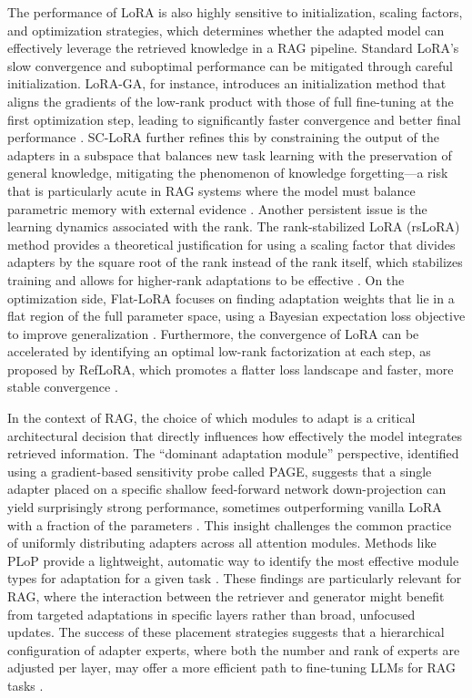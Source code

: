 \documentclass[11pt]{article}
\begin{document}
The performance of LoRA is also highly sensitive to initialization, scaling factors, and optimization strategies, which determines whether the adapted model can effectively leverage the retrieved knowledge in a RAG pipeline. Standard LoRA's slow convergence and suboptimal performance can be mitigated through careful initialization. LoRA-GA, for instance, introduces an initialization method that aligns the gradients of the low-rank product with those of full fine-tuning at the first optimization step, leading to significantly faster convergence and better final performance \cite{ref243}. SC-LoRA further refines this by constraining the output of the adapters in a subspace that balances new task learning with the preservation of general knowledge, mitigating the phenomenon of knowledge forgetting---a risk that is particularly acute in RAG systems where the model must balance parametric memory with external evidence \cite{ref244}. Another persistent issue is the learning dynamics associated with the rank. The rank-stabilized LoRA (rsLoRA) method provides a theoretical justification for using a scaling factor that divides adapters by the square root of the rank instead of the rank itself, which stabilizes training and allows for higher-rank adaptations to be effective \cite{ref245}. On the optimization side, Flat-LoRA focuses on finding adaptation weights that lie in a flat region of the full parameter space, using a Bayesian expectation loss objective to improve generalization \cite{ref246}. Furthermore, the convergence of LoRA can be accelerated by identifying an optimal low-rank factorization at each step, as proposed by RefLoRA, which promotes a flatter loss landscape and faster, more stable convergence \cite{ref247}.

In the context of RAG, the choice of which modules to adapt is a critical architectural decision that directly influences how effectively the model integrates retrieved information. The ``dominant adaptation module'' perspective, identified using a gradient-based sensitivity probe called PAGE, suggests that a single adapter placed on a specific shallow feed-forward network down-projection can yield surprisingly strong performance, sometimes outperforming vanilla LoRA with a fraction of the parameters \cite{ref248}. This insight challenges the common practice of uniformly distributing adapters across all attention modules. Methods like PLoP provide a lightweight, automatic way to identify the most effective module types for adaptation for a given task \cite{ref249}. These findings are particularly relevant for RAG, where the interaction between the retriever and generator might benefit from targeted adaptations in specific layers rather than broad, unfocused updates. The success of these placement strategies suggests that a hierarchical configuration of adapter experts, where both the number and rank of experts are adjusted per layer, may offer a more efficient path to fine-tuning LLMs for RAG tasks \cite{ref250}.
\end{document}
